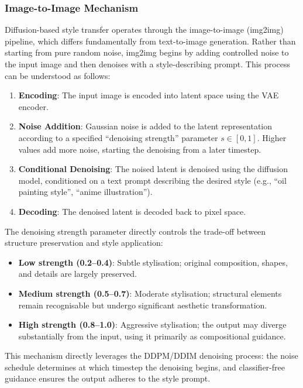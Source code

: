 \documentclass[12pt,a4paper]{report}
\begin{document}
\subsubsection{Image-to-Image Mechanism}

Diffusion-based style transfer operates through the image-to-image (img2img) pipeline, which differs fundamentally from text-to-image generation. Rather than starting from pure random noise, img2img begins by adding controlled noise to the input image and then denoises with a style-describing prompt. This process can be understood as follows:

\begin{enumerate}
    \item \textbf{Encoding}: The input image is encoded into latent space using the VAE encoder.
    \item \textbf{Noise Addition}: Gaussian noise is added to the latent representation according to a specified ``denoising strength'' parameter $s \in [0, 1]$. Higher values add more noise, starting the denoising from a later timestep.
    \item \textbf{Conditional Denoising}: The noised latent is denoised using the diffusion model, conditioned on a text prompt describing the desired style (e.g., ``oil painting style'', ``anime illustration'').
    \item \textbf{Decoding}: The denoised latent is decoded back to pixel space.
\end{enumerate}

The denoising strength parameter directly controls the trade-off between structure preservation and style application:
\begin{itemize}
    \item \textbf{Low strength (0.2--0.4)}: Subtle stylisation; original composition, shapes, and details are largely preserved.
    \item \textbf{Medium strength (0.5--0.7)}: Moderate stylisation; structural elements remain recognisable but undergo significant aesthetic transformation.
    \item \textbf{High strength (0.8--1.0)}: Aggressive stylisation; the output may diverge substantially from the input, using it primarily as compositional guidance.
\end{itemize}

This mechanism directly leverages the DDPM/DDIM denoising process: the noise schedule determines at which timestep the denoising begins, and classifier-free guidance ensures the output adheres to the style prompt.
\end{document}
